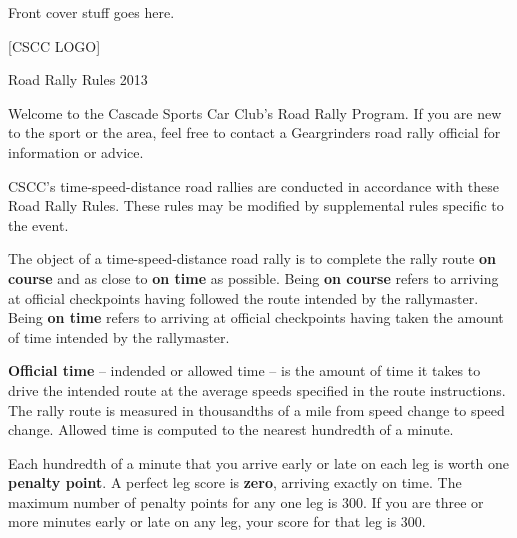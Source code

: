 \documentclass[letterpaper,9pt]{article}
\newcommand{\sectionhook}{
  \setlength{\unitlength}{1mm}
  \begin{picture}(0,0)
  \linethickness{.4mm} %
  \put(0,-2){\line(0,10){8}} %
  \linethickness{.6mm} 
  \put(0,-2){\line(10,0){6}} %
  \end{picture}
}
\begin{document}
\titleformat{\section}[hang]{\large}{}{1em}{\sectionhook} %
\titlespacing{\section}{6mm}{1pt}{12mm} %


\pagestyle{empty}
\begin{titlepage}
Front cover stuff goes here.

[CSCC LOGO]

Road Rally Rules 2013
\end{titlepage}
\newpage

Welcome to the Cascade Sports Car Club's Road Rally Program. If you are new to the sport or the area, feel free to contact a Geargrinders road rally official for information or advice.

CSCC's time-speed-distance road rallies are conducted in accordance with these Road Rally Rules. These rules may be modified by supplemental rules specific to the event.

The object of a time-speed-distance road rally is to complete the rally route \textbf{on course} and as close to \textbf{on time} as possible. Being \textbf{on course} refers to arriving at official checkpoints having followed the route intended by the rallymaster. Being \textbf{on time} refers to arriving at official checkpoints having taken the amount of time intended by the rallymaster.

\textbf{Official time} -- indended or allowed time -- is the amount of time it takes to drive the intended route at the average speeds specified in the route instructions. The rally route is measured in thousandths of a mile from speed change to speed change. Allowed time is computed to the nearest hundredth of a minute.

Each hundredth of a minute that you arrive early or late on each leg is worth one \textbf{penalty point}. A perfect leg score is \textbf{zero}, arriving exactly on time. The maximum number of penalty points for any one leg is 300. If you are three or more minutes early or late on any leg, your score for that leg is 300.
\end{document}
